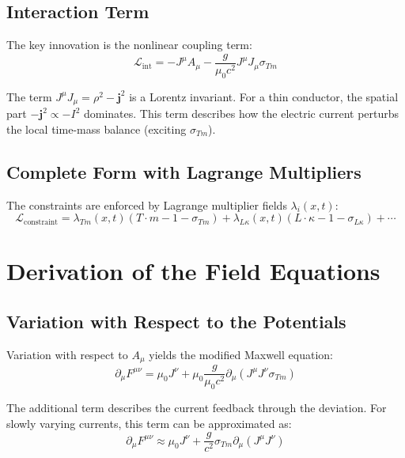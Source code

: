 \documentclass[10pt, a4paper]{article}
\begin{document}
	\subsection{Interaction Term}
	The key innovation is the nonlinear coupling term:
	\begin{equation}
		\mathcal{L}_{\text{int}} = -J^\mu A_\mu - \frac{g}{\mu_0 c^2} J^\mu J_\mu \sigma_{Tm} \label{eq:L_int}
	\end{equation}
	
	The term $J^\mu J_\mu = \rho^2 - \mathbf{j}^2$ is a Lorentz invariant. For a thin conductor, the spatial part $-\mathbf{j}^2 \propto -I^2$ dominates. This term describes how the electric current perturbs the local time-mass balance (exciting $\sigma_{Tm}$).
	
	\subsection{Complete Form with Lagrange Multipliers}
	The constraints are enforced by Lagrange multiplier fields $\lambda_i(x,t)$:
	\begin{equation}
		\mathcal{L}_{\text{constraint}} = \lambda_{Tm}(x,t) (T \cdot m - 1 - \sigma_{Tm}) + \lambda_{L\kappa}(x,t) (L \cdot \kappa - 1 - \sigma_{L\kappa}) + \cdots \label{eq:L_constraint}
	\end{equation}
	
	\section{Derivation of the Field Equations}
	\subsection{Variation with Respect to the Potentials}
	Variation with respect to $A_\mu$ yields the modified Maxwell equation:
	\begin{equation}
		\partial_\mu F^{\mu\nu} = \mu_0 J^\nu + \mu_0 \frac{g}{\mu_0 c^2} \partial_\mu (J^\mu J^\nu \sigma_{Tm}) \label{eq:maxwell_mod}
	\end{equation}
	
	The additional term describes the current feedback through the deviation. For slowly varying currents, this term can be approximated as:
	\begin{equation}
		\partial_\mu F^{\mu\nu} \approx \mu_0 J^\nu + \frac{g}{c^2} \sigma_{Tm} \partial_\mu (J^\mu J^\nu) \label{eq:maxwell_approx}
	\end{equation}
	
\end{document}
